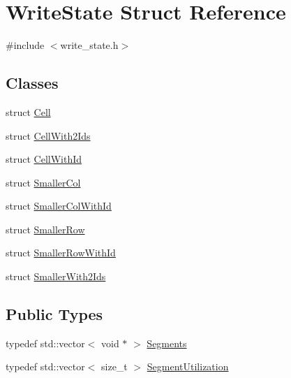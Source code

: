 \hypertarget{structWriteState}{}\section{Write\+State Struct Reference}
\label{structWriteState}


{\ttfamily \#include $<$write\+\_\+state.\+h$>$}

\subsection*{Classes}
\begin{DoxyCompactItemize}
\item 
struct \hyperlink{structWriteState_1_1Cell}{Cell}
\item 
struct \hyperlink{structWriteState_1_1CellWith2Ids}{Cell\+With2\+Ids}
\item 
struct \hyperlink{structWriteState_1_1CellWithId}{Cell\+With\+Id}
\item 
struct \hyperlink{structWriteState_1_1SmallerCol}{Smaller\+Col}
\item 
struct \hyperlink{structWriteState_1_1SmallerColWithId}{Smaller\+Col\+With\+Id}
\item 
struct \hyperlink{structWriteState_1_1SmallerRow}{Smaller\+Row}
\item 
struct \hyperlink{structWriteState_1_1SmallerRowWithId}{Smaller\+Row\+With\+Id}
\item 
struct \hyperlink{structWriteState_1_1SmallerWith2Ids}{Smaller\+With2\+Ids}
\end{DoxyCompactItemize}
\subsection*{Public Types}
\begin{DoxyCompactItemize}
\item 
typedef std\+::vector$<$ void $\ast$ $>$ \hyperlink{structWriteState_aad30b2ca76d7c514032911e74076cfc5}{Segments}
\item 
typedef std\+::vector$<$ size\+\_\+t $>$ \hyperlink{structWriteState_ae2a9d7195188e68b68d0c33725cbf460}{Segment\+Utilization}
\end{DoxyCompactItemize}

